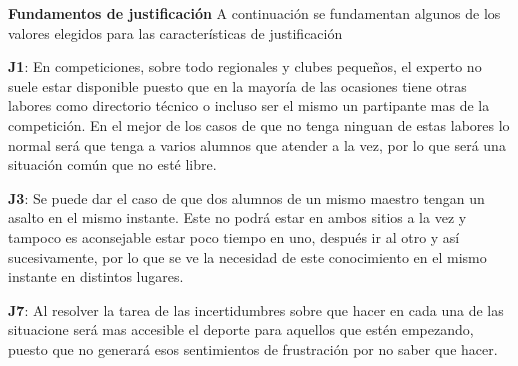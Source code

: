\textbf{Fundamentos de justificación}
A continuación se fundamentan algunos de los valores elegidos para las características de justificación

\begin{compactitem}
  \item[\textbf{J1}:] En competiciones, sobre todo regionales y clubes pequeños, el experto
     no suele estar disponible puesto que en la mayoría de las ocasiones tiene otras labores
     como directorio técnico o incluso ser el mismo un partipante mas de la competición.
     En el mejor de los casos de que no tenga ninguan de estas labores lo normal será que
     tenga a varios alumnos que atender a la vez, por lo que será una situación común que no esté libre.
  \item[\textbf{J3}:] Se puede dar el caso de que dos alumnos de un mismo maestro tengan un
     asalto en el mismo instante. Este no podrá estar en ambos sitios a la vez y tampoco es
     aconsejable estar poco tiempo en uno, después ir al otro y así sucesivamente, por lo que
     se ve la necesidad de este conocimiento en el mismo instante en distintos lugares.
  \item[\textbf{J7}:] Al resolver la tarea de las incertidumbres sobre que hacer
     en cada una de las situacione será mas accesible el deporte para aquellos que estén
     empezando, puesto que no generará esos sentimientos de frustración por no saber que hacer.
\end{compactitem}

